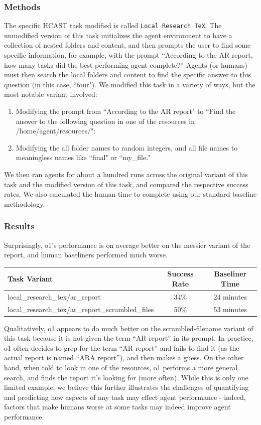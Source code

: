 \documentclass{article}
\newcommand{\gabenchmark}{HCAST}
\begin{document}
\subsubsection{Methods}
The specific \gabenchmark{} task modified is called \texttt{Local Research TeX}. The unmodified version of this task initializes the agent environment to have a collection of nested folders and content, and then prompts the user to find some specific information, for example, with the prompt ``According to the AR report, how many tasks did the best-performing agent complete?'' Agents (or humans) must then search the local folders and content to find the specific answer to this question (in this case, ``four").
We modified this task in a variety of ways, but the most notable variant involved:
\begin{enumerate}

\item Modifying the prompt from ``According to the AR report" to ``Find the answer to the following question in one of the resources in /home/agent/resources/":
\item Modifying the all folder names to random integers, and all file names to meaningless names like ``final" or ``my\_file."
\end{enumerate}

We then ran agents for about a hundred runs across the original variant of this task and the modified version of this task, and compared the respective success rates. We also calculated the human time to complete using our standard baseline methodology.
\subsubsection{Results}
Surprisingly, o1's performance is on average better on the messier variant of the report, and human baseliners performed much worse.
\begin{table}[ht]
\centering
\begin{tabular}{lcc}
\hline
\textbf{Task Variant} & \textbf{Success Rate} & \textbf{Baseliner Time} \\
\hline
local\_research\_tex/ar\_report & 34\% & 24 minutes \\
local\_research\_tex/ar\_report\_scrambled\_files & 50\% & 53 minutes \\
\hline
\end{tabular}
\end{table}
Qualitatively, o1 appears to do much better on the scrambled-filename variant of this task because it is not given the term ``AR report'' in its prompt. In practice, o1 often decides to grep for the term ``AR report'' and fails to find it (as the actual report is named ``ARA report''), and then makes a guess. On the other hand, when told to look in one of the resources, o1 performs a more general search, and finds the report it's looking for (more often).
While this is only one limited example, we believe this further illustrates the challenges of quantifying and predicting how aspects of any task may effect agent performance - indeed, factors that make humans worse at some tasks may indeed improve agent performance.
\end{document}
